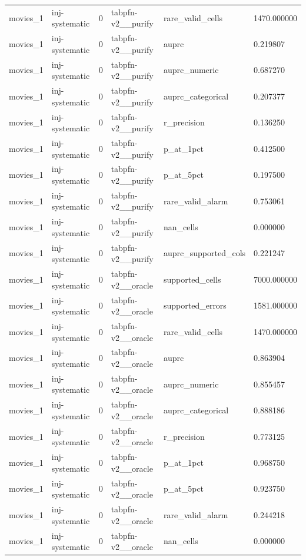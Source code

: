 \begin{tabular}{llllll}
movies\_1 & inj-systematic & 0 & tabpfn-v2\_\_purify & rare\_valid\_cells & 1470.000000 \\
movies\_1 & inj-systematic & 0 & tabpfn-v2\_\_purify & auprc & 0.219807 \\
movies\_1 & inj-systematic & 0 & tabpfn-v2\_\_purify & auprc\_numeric & 0.687270 \\
movies\_1 & inj-systematic & 0 & tabpfn-v2\_\_purify & auprc\_categorical & 0.207377 \\
movies\_1 & inj-systematic & 0 & tabpfn-v2\_\_purify & r\_precision & 0.136250 \\
movies\_1 & inj-systematic & 0 & tabpfn-v2\_\_purify & p\_at\_1pct & 0.412500 \\
movies\_1 & inj-systematic & 0 & tabpfn-v2\_\_purify & p\_at\_5pct & 0.197500 \\
movies\_1 & inj-systematic & 0 & tabpfn-v2\_\_purify & rare\_valid\_alarm & 0.753061 \\
movies\_1 & inj-systematic & 0 & tabpfn-v2\_\_purify & nan\_cells & 0.000000 \\
movies\_1 & inj-systematic & 0 & tabpfn-v2\_\_purify & auprc\_supported\_cols & 0.221247 \\
movies\_1 & inj-systematic & 0 & tabpfn-v2\_\_oracle & supported\_cells & 7000.000000 \\
movies\_1 & inj-systematic & 0 & tabpfn-v2\_\_oracle & supported\_errors & 1581.000000 \\
movies\_1 & inj-systematic & 0 & tabpfn-v2\_\_oracle & rare\_valid\_cells & 1470.000000 \\
movies\_1 & inj-systematic & 0 & tabpfn-v2\_\_oracle & auprc & 0.863904 \\
movies\_1 & inj-systematic & 0 & tabpfn-v2\_\_oracle & auprc\_numeric & 0.855457 \\
movies\_1 & inj-systematic & 0 & tabpfn-v2\_\_oracle & auprc\_categorical & 0.888186 \\
movies\_1 & inj-systematic & 0 & tabpfn-v2\_\_oracle & r\_precision & 0.773125 \\
movies\_1 & inj-systematic & 0 & tabpfn-v2\_\_oracle & p\_at\_1pct & 0.968750 \\
movies\_1 & inj-systematic & 0 & tabpfn-v2\_\_oracle & p\_at\_5pct & 0.923750 \\
movies\_1 & inj-systematic & 0 & tabpfn-v2\_\_oracle & rare\_valid\_alarm & 0.244218 \\
movies\_1 & inj-systematic & 0 & tabpfn-v2\_\_oracle & nan\_cells & 0.000000 \\

\end{tabular}
